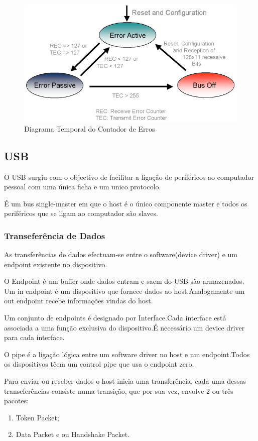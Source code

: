 \documentclass[10pt,a4paper]{paper}
\begin{document}
	\begin{figure}[ht]
		\includegraphics[scale=0.5] {fig17.png}
		\centering
		\caption {Diagrama Temporal do Contador de Erros}
		\label{fig:figura11}
	\end{figure}

\subsection*{USB}

O USB surgiu com o objectivo de facilitar a ligação de periféricos ao computador pessoal com uma única ficha e um unico protocolo.

É um bus single-master em que o host é o único componente master e todos os periféricos que se ligam ao  computador são slaves.

\subsubsection*{Transeferência de Dados}

As transferências de dados efectuam-se entre o software(device driver) e um endpoint  existente no dispositivo.

O Endpoint é um buffer onde dados entram e saem do USB são armazenados. Um in endpoint é um dispositivo que fornece dados ao host.Analogamente  um out endpoint recebe informações vindas do host.

Um conjunto de endpoints é designado por Interface.Cada interface está associada a uma função exclusiva do dispositivo.É necessário um device driver para cada interface.

O pipe é a ligação lógica entre um software driver no host e um endpoint.Todos os dispositivos têem um control pipe que usa o endpoint zero.

Para enviar ou receber dados o host inicia uma transferência, cada uma dessas transeferências consiste numa transição, que por sua vez, envolve 2 ou três pacotes:
\begin{enumerate}
\item Token Packet;
\item Data Packet e ou Handshake Packet.
\end{enumerate}
\end{document}
